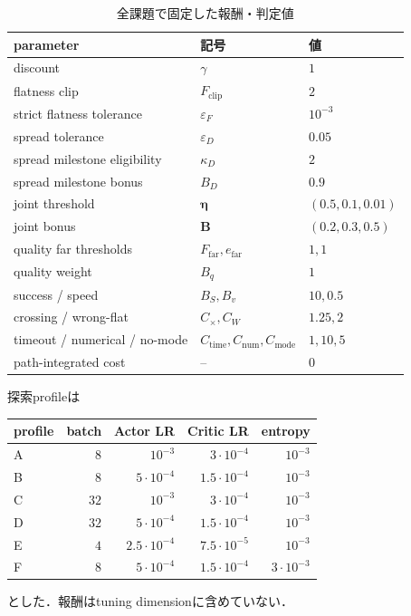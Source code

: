 \documentclass[a4paper,11pt]{ltjsarticle}
\begin{document}
\begin{table}[htbp]
\centering
\small
\caption{全課題で固定した報酬・判定値}
\label{tab:fixed-reward}
\begin{tabular}{lll}
\toprule
parameter & 記号 & 値 \\
\midrule
discount & $\gamma$ & $1$ \\
flatness clip & $F_{\mathrm{clip}}$ & $2$ \\
strict flatness tolerance & $\varepsilon_F$ & $10^{-3}$ \\
spread tolerance & $\varepsilon_D$ & $0.05$ \\
spread milestone eligibility & $\kappa_D$ & $2$ \\
spread milestone bonus & $B_D$ & $0.9$ \\
joint threshold & $\bm\eta$ & $(0.5,0.1,0.01)$ \\
joint bonus & $\bm B$ & $(0.2,0.3,0.5)$ \\
quality far thresholds & $F_{\mathrm{far}},e_{\mathrm{far}}$ & $1,1$ \\
quality weight & $B_q$ & $1$ \\
success / speed & $B_S,B_v$ & $10,0.5$ \\
crossing / wrong-flat & $C_\times,C_W$ & $1.25,2$ \\
timeout / numerical / no-mode
 & $C_{\mathrm{time}},C_{\mathrm{num}},C_{\mathrm{mode}}$ & $1,10,5$ \\
path-integrated cost & -- & $0$ \\
\bottomrule
\end{tabular}
\end{table}

探索profileは
\begin{center}
\begin{tabular}{lrrrr}
\toprule
profile & batch & Actor LR & Critic LR & entropy \\
\midrule
A & $8$ & $10^{-3}$ & $3\cdot10^{-4}$ & $10^{-3}$ \\
B & $8$ & $5\cdot10^{-4}$ & $1.5\cdot10^{-4}$ & $10^{-3}$ \\
C & $32$ & $10^{-3}$ & $3\cdot10^{-4}$ & $10^{-3}$ \\
D & $32$ & $5\cdot10^{-4}$ & $1.5\cdot10^{-4}$ & $10^{-3}$ \\
E & $4$ & $2.5\cdot10^{-4}$ & $7.5\cdot10^{-5}$ & $10^{-3}$ \\
F & $8$ & $5\cdot10^{-4}$ & $1.5\cdot10^{-4}$ & $3\cdot10^{-3}$ \\
\bottomrule
\end{tabular}
\end{center}
とした．報酬はtuning dimensionに含めていない．
\end{document}
